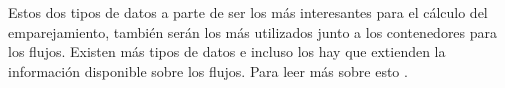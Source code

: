 \intro Estos dos tipos de datos a parte de ser los más interesantes para el cálculo del emparejamiento, también 
serán los más utilizados junto a los contenedores para los flujos. Existen más tipos de datos e incluso los hay que 
extienden la información disponible sobre los flujos. Para leer más sobre esto \cite{conntype}.
